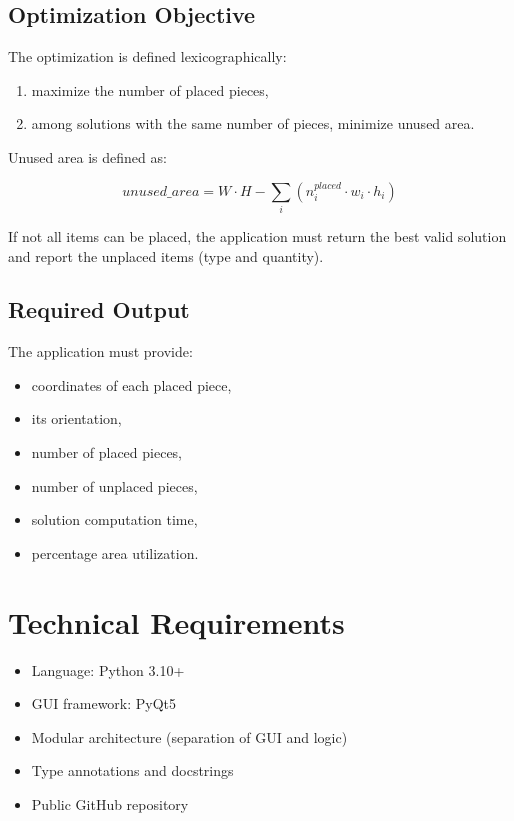 \documentclass[12pt,a4paper]{article}
\begin{document}
\subsection{Optimization Objective}

The optimization is defined lexicographically:

\begin{enumerate}
    \item maximize the number of placed pieces,
    \item among solutions with the same number of pieces, minimize unused area.
\end{enumerate}

Unused area is defined as:

\begin{equation}
unused\_area = W \cdot H - \sum_i (n_i^{placed} \cdot w_i \cdot h_i)
\label{eq:unused_area}
\end{equation}

If not all items can be placed, the application must return the best valid solution and report the unplaced items (type and quantity).

\subsection{Required Output}

The application must provide:

\begin{itemize}
    \item coordinates of each placed piece,
    \item its orientation,
    \item number of placed pieces,
    \item number of unplaced pieces,
    \item solution computation time,
    \item percentage area utilization.
\end{itemize}

\section{Technical Requirements}

\begin{itemize}
    \item Language: Python 3.10+
    \item GUI framework: PyQt5
    \item Modular architecture (separation of GUI and logic)
    \item Type annotations and docstrings
    \item Public GitHub repository
\end{itemize}
\end{document}
